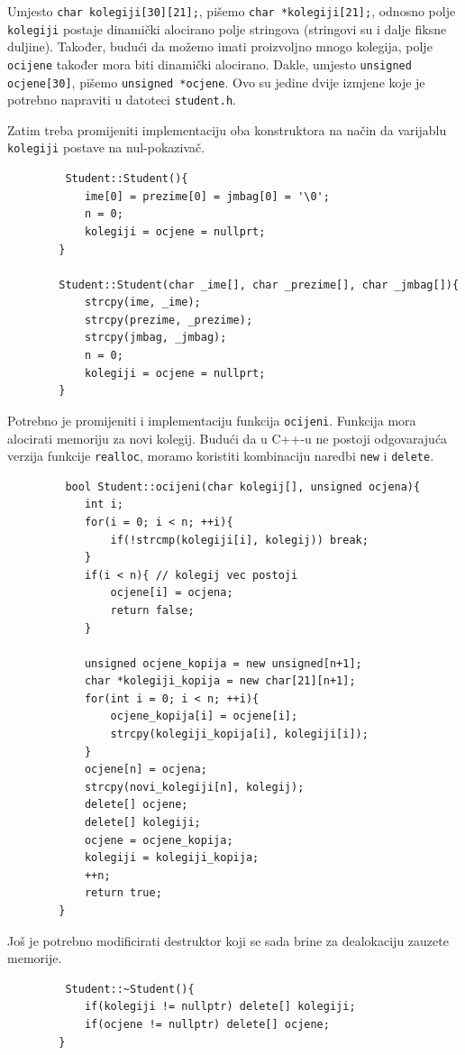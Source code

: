 \begin{rjesenje}
    Umjesto \texttt{char kolegiji[30][21];}, pišemo \texttt{char *kolegiji[21];}, odnosno polje \texttt{kolegiji} postaje dinamički alocirano polje stringova (stringovi su i dalje fiksne duljine). Također, budući da možemo imati proizvoljno mnogo kolegija, polje \texttt{ocijene} također mora biti dinamički alocirano. Dakle, umjesto \texttt{unsigned ocjene[30]}, pišemo \texttt{unsigned *ocjene}. Ovo su jedine dvije izmjene koje je potrebno napraviti u datoteci \texttt{student.h}.
    
    Zatim treba promijeniti implementaciju oba konstruktora na način da varijablu \texttt{kolegiji} postave na nul-pokazivač.

    \begin{verbatim}
         Student::Student(){
            ime[0] = prezime[0] = jmbag[0] = '\0';
            n = 0;
            kolegiji = ocjene = nullprt;
        }

        Student::Student(char _ime[], char _prezime[], char _jmbag[]){
            strcpy(ime, _ime);
            strcpy(prezime, _prezime);
            strcpy(jmbag, _jmbag);
            n = 0;
            kolegiji = ocjene = nullprt;
        }
    \end{verbatim}

    Potrebno je promijeniti i implementaciju funkcija \texttt{ocijeni}. Funkcija mora alocirati memoriju za novi kolegij. Budući da u C++-u ne postoji odgovarajuća verzija funkcije \texttt{realloc}, moramo koristiti kombinaciju naredbi \texttt{new} i \texttt{delete}.

    \begin{verbatim}
         bool Student::ocijeni(char kolegij[], unsigned ocjena){
            int i;
            for(i = 0; i < n; ++i){
                if(!strcmp(kolegiji[i], kolegij)) break;
            }
            if(i < n){ // kolegij vec postoji
                ocjene[i] = ocjena;
                return false;
            }

            unsigned ocjene_kopija = new unsigned[n+1];
            char *kolegiji_kopija = new char[21][n+1];
            for(int i = 0; i < n; ++i){
                ocjene_kopija[i] = ocjene[i];
                strcpy(kolegiji_kopija[i], kolegiji[i]);
            }
            ocjene[n] = ocjena;
            strcpy(novi_kolegiji[n], kolegij);
            delete[] ocjene;
            delete[] kolegiji;
            ocjene = ocjene_kopija;
            kolegiji = kolegiji_kopija;
            ++n;
            return true;
        }
    \end{verbatim}
    
    Još je potrebno modificirati destruktor koji se sada brine za dealokaciju zauzete memorije.
    \begin{verbatim}
         Student::~Student(){
            if(kolegiji != nullptr) delete[] kolegiji;
            if(ocjene != nullptr) delete[] ocjene;
        }
    \end{verbatim}

\end{rjesenje}

